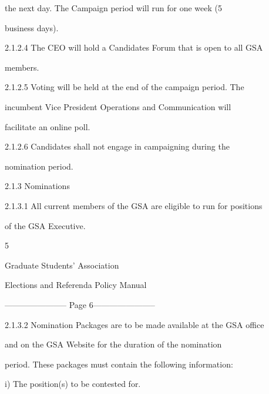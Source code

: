                the  next  day.  The  Campaign  period  will  run  for  one  week  (5  

               business days).   

  

2.1.2.4        The CEO will hold a  Candidates Forum that is open to all GSA  

               members.   

  

  

2.1.2.5        Voting  will  be  held  at  the  end  of  the  campaign  period.  The  

               incumbent  Vice  President  Operations  and  Communication  will  

               facilitate an online poll.   

2.1.2.6        Candidates         shall     not     engage       in    campaigning          during       the  

               nomination period.  

  

2.1.3  Nominations  

  

2.1.3.1        All current members of the GSA are eligible to run for positions  

               of the GSA Executive.   



                                                       5  

                                                                                                               

                                Graduate Students’ Association  

                          Elections and Referenda Policy Manual  

  


----------------------- Page 6-----------------------

  

2.1.3.2         Nomination Packages are to be made available at the GSA office  

                and  on  the  GSA  Website  for  the  duration  of  the  nomination  

                period. These packages must contain the following information:   

  

                   i)        The position(s) to be contested for.   

